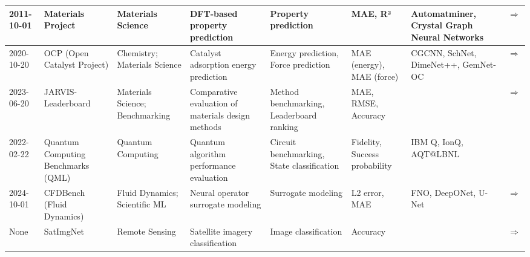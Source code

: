 \documentclass{article}
\begin{document}
\begin{landscape}
{\begin{longtable}{|p{1.5cm}|p{2.5cm}|p{2cm}|p{2cm}|p{3cm}|p{2cm}|p{2cm}|p{1cm}|}
2011-10-01 & Materials Project & Materials Science & DFT-based property prediction & Property prediction & MAE, R² & Automatminer, Crystal Graph Neural Networks & \cite{jain2013materials} \href{https://materialsproject.org/}{$\Rightarrow$ } \\ \hline
2020-10-20 & OCP (Open Catalyst Project) & Chemistry; Materials Science & Catalyst adsorption energy prediction & Energy prediction, Force prediction & MAE (energy), MAE (force) & CGCNN, SchNet, DimeNet++, GemNet-OC & \cite{chanussot2021oc20, tran2023oc22, doi:10.1021/acscatal.0c04525, tran2023b} \href{https://pubs.acs.org/doi/10.1021/acscatal.0c04525}{$\Rightarrow$ } \\ \hline
2023-06-20 & JARVIS-Leaderboard & Materials Science; Benchmarking & Comparative evaluation of materials design methods & Method benchmarking, Leaderboard ranking & MAE, RMSE, Accuracy &  & \cite{choudhary2024jarvis} \href{https://doi.org/10.1038/s41524-024-01259-w}{$\Rightarrow$ } \\ \hline
2022-02-22 & Quantum Computing Benchmarks (QML) & Quantum Computing & Quantum algorithm performance evaluation & Circuit benchmarking, State classification & Fidelity, Success probability & IBM Q, IonQ, AQT@LBNL & \cite{, , , , , , , , , , , , , , , , , , , , , , , , , , , , , , , , , , , , , , , , , , , , , , , , , , , , , , , , , , , , , , , , , , , , , , , , , , , , , , , , , , , , , , , , , , , , , , , , , , , , , , , , , , , , , , , , , , , , , , , , , , , , , , , , , , , , , , , , , , , , , , , , , , , , , , , , , , , , , , , , , , , , , , , , , , , , , , , , , , , , , , , , , , , , , , , , , , , , , , , , , , , , , , , , , , , , , , , , , , , , , , , , , , , , , , , , , , , , , , , , , , , , , , , , , , , , , , , , , , , , , , , , , , , , , , , , , , , , , , , , , , , , , , , , , , , , , , , , , , , , , , , , , , , , , , , , , , , , , , , , , , , , , , , , , , , , , , , , , , , , , , , , , , , , , , , , , , , , , , , , , , , , , , , , , , , , , , , , , , , , , , , , , , , , , , , , , , , , , , , , , , , , , , , , , , , , , , , , , , , , , , , , , , , , , , , , , , , , , , , , , , , , , , , , , , , , , , , , , , , , , , , , , , , , , , , , , , , } \\ \hline
2024-10-01 & CFDBench (Fluid Dynamics) & Fluid Dynamics; Scientific ML & Neural operator surrogate modeling & Surrogate modeling & L2 error, MAE & FNO, DeepONet, U-Net & \cite{luo2024cfdbenchlargescalebenchmarkmachine} \href{https://arxiv.org/abs/2310.05963}{$\Rightarrow$ } \\ \hline
None & SatImgNet & Remote Sensing & Satellite imagery classification & Image classification & Accuracy &  & \cite{roberts2023satinmultitaskmetadatasetclassifying} \href{https://arxiv.org/abs/2304.11619}{$\Rightarrow$ } \\ \hline

\end{longtable}}
\end{landscape}
\end{document}
